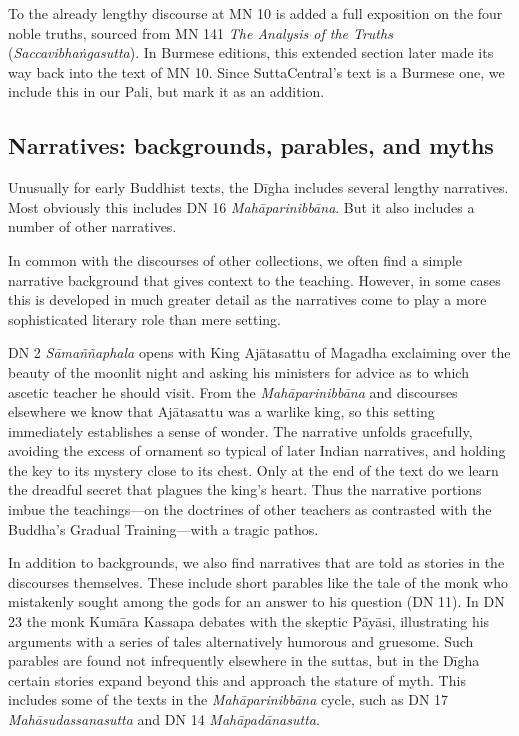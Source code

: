 \documentclass[12pt,openany]{book}%
\begin{document}
To the already lengthy discourse at MN 10 is added a full exposition on the four noble truths, sourced from MN 141 \textit{The Analysis of the Truths} (\textit{\textsanskrit{Saccavibhaṅgasutta}}). In Burmese editions, this extended section later made its way back into the text of MN 10. Since SuttaCentral’s text is a Burmese one, we include this in our Pali, but mark it as an addition.

\subsection*{Narratives: backgrounds, parables, and myths}

Unusually for early Buddhist texts, the \textsanskrit{Dīgha} includes several lengthy narratives. Most obviously this includes DN 16 \textit{\textsanskrit{Mahāparinibbāna}}. But it also includes a number of other narratives.

In common with the discourses of other collections, we often find a simple narrative background that gives context to the teaching. However, in some cases this is developed in much greater detail as the narratives come to play a more sophisticated literary role than mere setting.

DN 2 \textit{\textsanskrit{Sāmaññaphala}} opens with King \textsanskrit{Ajātasattu} of Magadha exclaiming over the beauty of the moonlit night and asking his ministers for advice as to which ascetic teacher he should visit. From the \textit{\textsanskrit{Mahāparinibbāna}} and discourses elsewhere we know that \textsanskrit{Ajātasattu} was a warlike king, so this setting immediately establishes a sense of wonder. The narrative unfolds gracefully, avoiding the excess of ornament so typical of later Indian narratives, and holding the key to its mystery close to its chest. Only at the end of the text do we learn the dreadful secret that plagues the king’s heart. Thus the narrative portions imbue the teachings—on the doctrines of other teachers as contrasted with the Buddha’s Gradual Training—with a tragic pathos.

In addition to backgrounds, we also find narratives that are told as stories in the discourses themselves. These include short parables like the tale of the monk who mistakenly sought among the gods for an answer to his question (DN 11). In DN 23 the monk \textsanskrit{Kumāra} Kassapa debates with the skeptic \textsanskrit{Pāyāsi}, illustrating his arguments with a series of tales alternatively humorous and gruesome. Such parables are found not infrequently elsewhere in the suttas, but in the \textsanskrit{Dīgha} certain stories expand beyond this and approach the stature of myth. This includes some of the texts in the \textit{\textsanskrit{Mahāparinibbāna}} cycle, such as DN 17 \textit{\textsanskrit{Mahāsudassanasutta}} and DN 14 \textit{\textsanskrit{Mahāpadānasutta}}.
\end{document}

